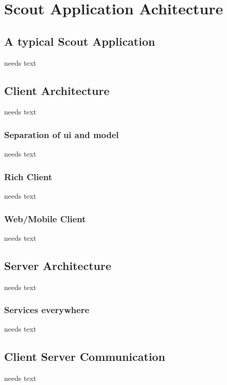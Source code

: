 \documentclass[a4paper,10pt,twoside]{book}
\begin{document}
  \sloppy
\fi


\chapter{Scout Application Achitecture}

\section{A typical Scout Application}
needs text

\section{Client Architecture}
needs text

\subsection{Separation of ui and model}
needs text

\subsection{Rich Client}
needs text

\subsection{Web/Mobile Client}
needs text
  
\section{Server Architecture}
needs text

\subsection{Services everywhere}
needs text

\section{Client Server Communication}
needs text
  
\end{document}

